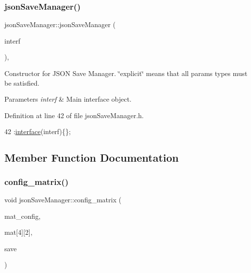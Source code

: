 \subsubsection{\texorpdfstring{json\+Save\+Manager()}{jsonSaveManager()}}
{\footnotesize\ttfamily json\+Save\+Manager\+::json\+Save\+Manager (\begin{DoxyParamCaption}\item[{\hyperlink{class_v_s_s_s___g_u_i_1_1_v4_l_interface}{V4\+L\+Interface} $\ast$}]{interf }\end{DoxyParamCaption})\hspace{0.3cm}{\ttfamily [inline]}, {\ttfamily [explicit]}}



Constructor for J\+S\+ON Save Manager. \char`\"{}explicit\char`\"{} means that all params types must be satisfied. 


\begin{DoxyParams}{Parameters}
{\em interf} & Main interface object. \\
\hline
\end{DoxyParams}


Definition at line 42 of file json\+Save\+Manager.\+h.


\begin{DoxyCode}
42 :\hyperlink{classjson_save_manager_a91983cf64bdd03c74cd6d4576cb521cf}{interface}(interf)\{\};
\end{DoxyCode}


\subsection{Member Function Documentation}
\mbox{\label{classjson_save_manager_ae135d7cd743cba1f0801e80934fdd824}} 
\subsubsection{\texorpdfstring{config\+\_\+matrix()}{config\_matrix()}}
{\footnotesize\ttfamily void json\+Save\+Manager\+::config\+\_\+matrix (\begin{DoxyParamCaption}\item[{\hyperlink{json_save_manager_8h_ab701e3ac61a85b337ec5c1abaad6742d}{json} \&}]{mat\+\_\+config,  }\item[{int(\&)}]{mat\mbox{[}4\mbox{]}\mbox{[}2\mbox{]},  }\item[{bool}]{save }\end{DoxyParamCaption})}



